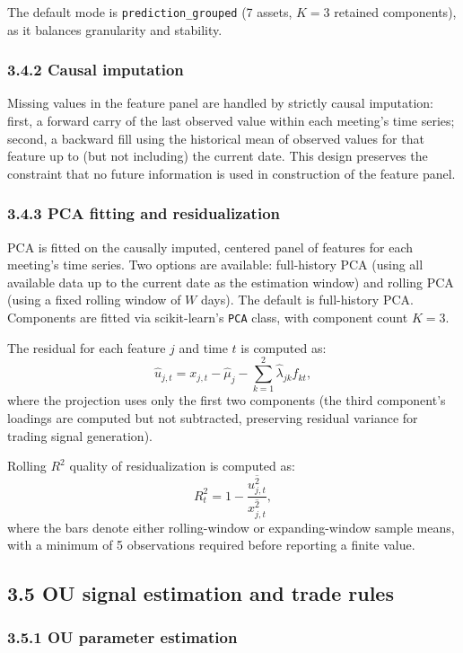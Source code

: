 The default mode is \texttt{prediction\_grouped} (7 assets, $K=3$ retained components), as it balances granularity and stability.

\subsubsection*{3.4.2 Causal imputation}

Missing values in the feature panel are handled by strictly causal imputation: first, a forward carry of the last observed value within each meeting's time series; second, a backward fill using the historical mean of observed values for that feature up to (but not including) the current date. This design preserves the constraint that no future information is used in construction of the feature panel.

\subsubsection*{3.4.3 PCA fitting and residualization}

PCA is fitted on the causally imputed, centered panel of features for each meeting's time series. Two options are available: full-history PCA (using all available data up to the current date as the estimation window) and rolling PCA (using a fixed rolling window of $W$ days). The default is full-history PCA. Components are fitted via scikit-learn's \texttt{PCA} class, with component count $K=3$.

The residual for each feature $j$ and time $t$ is computed as:
\[
\hat{u}_{j,t} = x_{j,t} - \hat{\mu}_j - \sum_{k=1}^{2} \hat{\lambda}_{jk} f_{kt},
\]
where the projection uses only the first two components (the third component's loadings are computed but not subtracted, preserving residual variance for trading signal generation).

Rolling $R^2$ quality of residualization is computed as:
\[
R^2_t = 1 - \frac{\overline{u_{j,t}^2}}{\overline{x_{j,t}^2}},
\]
where the bars denote either rolling-window or expanding-window sample means, with a minimum of 5 observations required before reporting a finite value.

\subsection*{3.5 OU signal estimation and trade rules}

\subsubsection*{3.5.1 OU parameter estimation}

